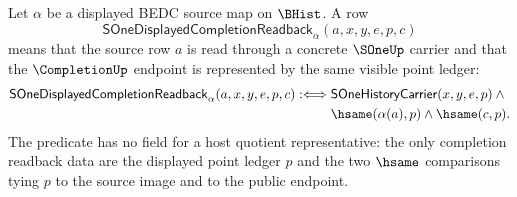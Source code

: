 \begin{definition}
\label{def:sone-displayed-completion-readback}
Let $\alpha$ be a displayed BEDC source map on $\BHist$. A row
$$
\mathsf{SOneDisplayedCompletionReadback}_{\alpha}(a,x,y,e,p,c)
$$
means that the source row $a$ is read through a concrete $\SOneUp$ carrier and
that the $\CompletionUp$ endpoint is represented by the same visible point
ledger:
$$
\begin{aligned}
\mathsf{SOneDisplayedCompletionReadback}_{\alpha}(a,x,y,e,p,c)
:\Longleftrightarrow{}&
\mathsf{SOneHistoryCarrier}(x,y,e,p)\land{}\\
&\hsame(\alpha(a),p)\land \hsame(c,p).
\end{aligned}
$$
The predicate has no field for a host quotient representative: the only
completion readback data are the displayed point ledger $p$ and the two
$\hsame$ comparisons tying $p$ to the source image and to the public endpoint.
\end{definition}

